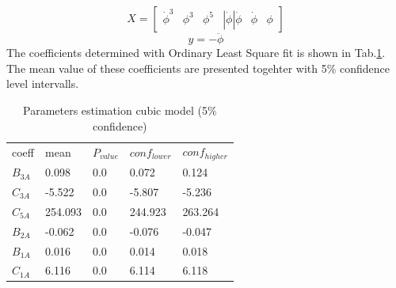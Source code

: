 \begin{equation}
X = \left[\begin{matrix}\dot{\phi}^{3} & \phi^{3} & \phi^{5} & \left|{\dot{\phi}}\right| \dot{\phi} & \dot{\phi} & \phi\end{matrix}\right]
\label{eq:eq_X}
\end{equation}
\begin{equation}
y = - \ddot{\phi}
\label{eq:eq_y}
\end{equation}
The coefficients determined with Ordinary Least Square fit is shown in
Tab.\ref{tab:parameters_one}. The mean value of these
coefficients are presented togehter with 5\% confidence level
intervalls.
\begin{table}[H]
\scriptsize
\center
\caption{Parameters estimation cubic model (5\% confidence)}
\label{tab:parameters_one}
\begin{tabular}{|l|l|l|l|l|}
\hline\addlinespace
coeff & mean & $P_{value}$ & $conf_{lower}$ & $conf_{higher}$\\
$B_{3A}$ & 0.098 & 0.0 & 0.072 & 0.124\\
\hline$C_{3A}$ & -5.522 & 0.0 & -5.807 & -5.236\\
$C_{5A}$ & 254.093 & 0.0 & 244.923 & 263.264\\
$B_{2A}$ & -0.062 & 0.0 & -0.076 & -0.047\\
$B_{1A}$ & 0.016 & 0.0 & 0.014 & 0.018\\
$C_{1A}$ & 6.116 & 0.0 & 6.114 & 6.118\\
\hline
\end{tabular}
\end{table}
